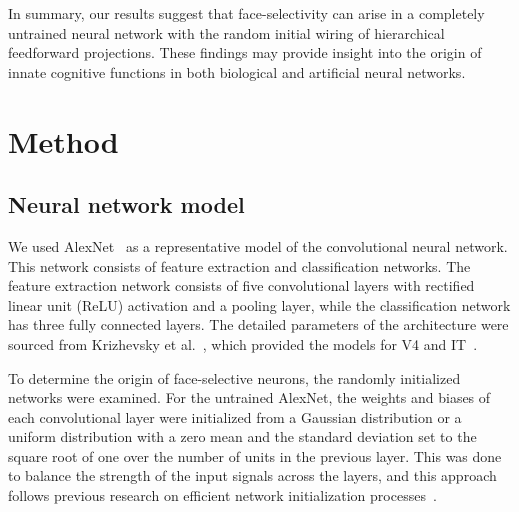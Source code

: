\documentclass[final,3p,times,twocolumn]{elsarticle}
\begin{document}
In summary, our results suggest that face-selectivity can arise in a completely untrained neural network with the random initial wiring of hierarchical feedforward projections.
These findings may provide insight into the origin of innate cognitive functions in both biological and artificial neural networks.





\section{Method}

\subsection{Neural network model} \label{sec:nn}
We used AlexNet~\cite{krizhevsky2012imagenet} as a representative model of the convolutional neural network.
This network consists of feature extraction and classification networks.
The feature extraction network consists of five convolutional layers with rectified linear unit (ReLU) activation and a pooling layer, while the classification network has three fully connected layers.
The detailed parameters of the architecture were sourced from Krizhevsky et al.~\cite{krizhevsky2012imagenet}, which provided the models for V4 and IT~\cite{cadieu2014deep}.


To determine the origin of face-selective neurons, the randomly initialized networks were examined.
For the untrained AlexNet, the weights and biases of each convolutional layer were initialized from a Gaussian distribution or a uniform distribution with a zero mean and the standard deviation set to the square root of one over the number of units in the previous layer.
This was done to balance the strength of the input signals across the layers, 
and this approach follows previous research on efficient network initialization processes~\cite{lecun2012efficient}.
\end{document}
